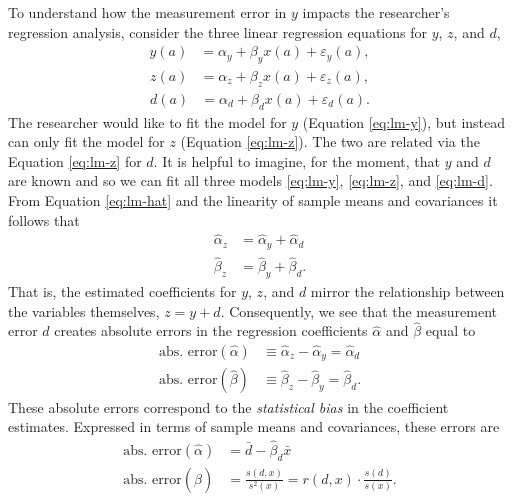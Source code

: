 \documentclass[
]{article}
\begin{document}
To understand how the measurement error in \(y\) impacts the researcher's regression analysis, consider the three linear regression equations for \(y\), \(z\), and \(d\),
\begin{align}
  \label{eq:lm-y}
  y(a) &= \alpha_y + \beta_y x(a) + \varepsilon_y(a),
\end{align}
\begin{align}
  \label{eq:lm-z}
  z(a) &= \alpha_z + \beta_z x(a) + \varepsilon_z(a),
\end{align}
\begin{align}
  \label{eq:lm-d}
  d(a) &= \alpha_d + \beta_d x(a) + \varepsilon_d(a).
\end{align}
The researcher would like to fit the model for \(y\) (Equation \eqref{eq:lm-y}), but instead can only fit the model for \(z\) (Equation \eqref{eq:lm-z}).
The two are related via the Equation \eqref{eq:lm-z} for \(d\).
It is helpful to imagine, for the moment, that \(y\) and \(d\) are known and so we can fit all three models \eqref{eq:lm-y}, \eqref{eq:lm-z}, and \eqref{eq:lm-d}.
From Equation \eqref{eq:lm-hat} and the linearity of sample means and covariances it follows that
\begin{align}
  \label{eq:lm-hat-rel}
  \hat \alpha_z &= \hat \alpha_y + \hat \alpha_d \\
  \hat \beta_z &= \hat \beta_y + \hat \beta_d.
\end{align}
That is, the estimated coefficients for \(y\), \(z\), and \(d\) mirror the relationship between the variables themselves, \(z = y + d\).
Consequently, we see that the measurement error \(d\) creates absolute errors in the regression coefficients \(\hat \alpha\) and \(\hat \beta\) equal to
\begin{align}
  \label{eq:lm-hat-err}
  \text{abs. error}(\hat \alpha) &\equiv \hat \alpha_z - \hat \alpha_y = \hat \alpha_d \\
  \text{abs. error}(\hat \beta) &\equiv \hat \beta_z - \hat \beta_y = \hat \beta_d.
\end{align}
These absolute errors correspond to the \emph{statistical bias} in the coefficient estimates.
Expressed in terms of sample means and covariances, these errors are
\begin{align}
  \label{eq:lm-hat-err-1}
  \text{abs. error}(\hat \alpha) &= \bar d - \hat \beta_d \bar x \\
  \text{abs. error}(\hat \beta)  &= \frac{s(d,x)}{s^2(x)} = r(d,x) \cdot \frac{s(d)}{s(x)}.
\end{align}
\end{document}
